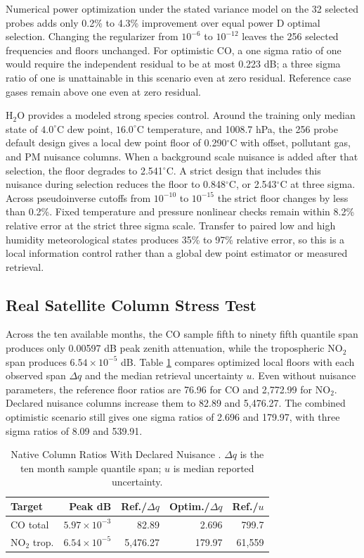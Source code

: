 \documentclass[conference]{IEEEtran}
\begin{document}
Numerical power optimization under the stated variance model on the 32 selected probes adds only 0.2\% to 4.3\% improvement over equal power D optimal selection. Changing the regularizer from $10^{-6}$ to $10^{-12}$ leaves the 256 selected frequencies and floors unchanged. For optimistic CO, a one sigma ratio of one would require the independent residual to be at most 0.223 dB; a three sigma ratio of one is unattainable in this scenario even at zero residual. Reference case gases remain above one even at zero residual.

H$_2$O provides a modeled strong species control. Around the training only median state of $4.0^\circ$C dew point, $16.0^\circ$C temperature, and 1008.7 hPa, the 256 probe default design gives a local dew point floor of 0.290$^\circ$C with offset, pollutant gas, and PM nuisance columns. When a background scale nuisance is added after that selection, the floor degrades to 2.541$^\circ$C. A strict design that includes this nuisance during selection reduces the floor to 0.848$^\circ$C, or 2.543$^\circ$C at three sigma. Across pseudoinverse cutoffs from $10^{-10}$ to $10^{-15}$ the strict floor changes by less than 0.2\%. Fixed temperature and pressure nonlinear checks remain within 8.2\% relative error at the strict three sigma scale. Transfer to paired low and high humidity meteorological states produces 35\% to 97\% relative error, so this is a local information control rather than a global dew point estimator or measured retrieval.

\subsection{Real Satellite Column Stress Test}

Across the ten available months, the CO sample fifth to ninety fifth quantile span produces only 0.00597 dB peak zenith attenuation, while the tropospheric NO$_2$ span produces $6.54\times10^{-5}$ dB. Table \ref{tab:columns} compares optimized local floors with each observed span $\Delta q$ and the median retrieval uncertainty $u$. Even without nuisance parameters, the reference floor ratios are 76.96 for CO and 2,772.99 for NO$_2$. Declared nuisance columns increase them to 82.89 and 5,476.27. The combined optimistic scenario still gives one sigma ratios of 2.696 and 179.97, with three sigma ratios of 8.09 and 539.91.

\begin{table}[t]
\caption{Native Column Ratios With Declared Nuisance \cite{esacciCO,esacciNO2}. $\Delta q$ is the ten month sample quantile span; $u$ is median reported uncertainty.}
\label{tab:columns}
\centering
\scriptsize
\setlength{\tabcolsep}{1.5pt}
\begin{tabular}{@{}lrrrr@{}}
\toprule
Target & Peak dB & Ref./$\Delta q$ & Optim./$\Delta q$ & Ref./$u$ \\
\midrule
CO total & $5.97\!\times\!10^{-3}$ & 82.89 & 2.696 & 799.7 \\
NO$_2$ trop. & $6.54\!\times\!10^{-5}$ & 5,476.27 & 179.97 & 61,559 \\
\bottomrule
\end{tabular}
\end{table}
\end{document}
